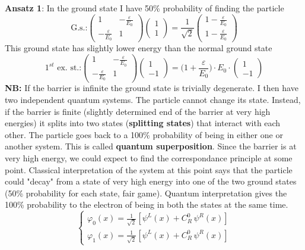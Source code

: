 \newline
\textbf{Ansatz 1}: In the ground state I have 50\% probability of finding the particle
\[
\text{G.s.:}
\begin{pmatrix}
1 & -\frac{\varepsilon}{E_0}\\
-\frac{\varepsilon}{E_0} & 1
\end{pmatrix}
\begin{pmatrix}
1\\1
\end{pmatrix}
=
\frac{1}{\sqrt{2}}
\begin{pmatrix}
1-\frac{\varepsilon}{E_0}\\1-\frac{\varepsilon}{E_0}
\end{pmatrix}
\]
This ground state has slightly lower energy than the normal ground state
\[
\text{$1^{st}$ ex. st.:}
\begin{pmatrix}
1 & -\frac{\varepsilon}{E_0}\\
-\frac{\varepsilon}{E_0} & 1
\end{pmatrix}
\begin{pmatrix}
1\\-1
\end{pmatrix}
=
\biggl(1+\frac{\varepsilon}{E_0}\biggr)\cdot E_0 \cdot
\begin{pmatrix}
1\\-1
\end{pmatrix}
\]
\textbf{NB:} If the barrier is infinite the ground state is trivially degenerate. I then have two independent quantum systems. The particle cannot change its state. Instead, if the barrier is finite (slightly determined end of the barrier at very high energies) it splits into two states (\textbf{splitting states}) that interact with each other. The particle goes back to a 100\% probability of being in either one or another system. This is called \textbf{quantum superposition}.
\newline
Since the barrier is at very high energy, we could expect to find the correspondance principle at some point. Classical interpretation of the system at this point says that the particle could "decay" from a state of very high energy into one of the two ground states (50\% probability for each state, fair game). Quantum interpretation gives the 100\% probability to the electron of being in both the states at the same time.\\
\[
\begin{cases}
\varphi_0(x) = \frac{1}{\sqrt{2}}[\psi^L(x)+C_R^0\,\psi^R(x)]\\
\varphi_1(x) = \frac{1}{\sqrt{2}}[\psi^L(x)+C_R^0\,\psi^R(x)]
\end{cases}
\]
